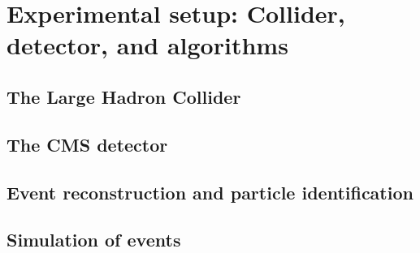 \chapter{Experimental setup: Collider, detector, and algorithms}

\section{The Large Hadron Collider}

\section{The CMS detector}

\section{Event reconstruction and particle identification}
\label{sec:reconstruction-and-identification}

\section{Simulation of events}
